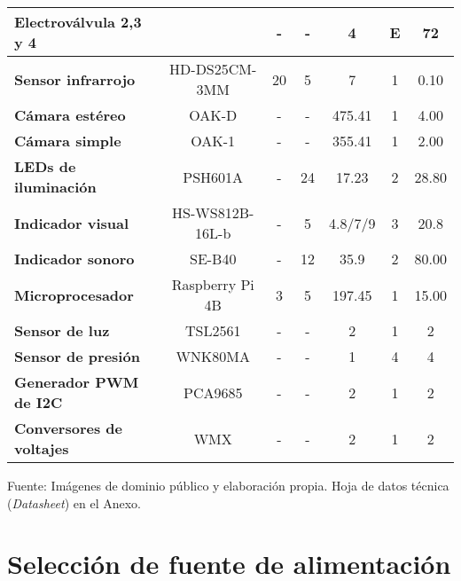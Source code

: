 \begin{mytable}[H]
\begin{tabular}{l|c|c|c|c|c|c|}
		\multicolumn{1}{|l|}{\cellcolor[HTML]{C0C0C0}\textbf{Electroválvula 2,3 y 4}} &  & - & - & 4 & E & 72 \\ \hline
		\multicolumn{1}{|l|}{\cellcolor[HTML]{C0C0C0}\textbf{Sensor infrarrojo}} & HD-DS25CM-3MM & 20 & 5 & 7 & 1 & 0.10 \\ \hline
		\multicolumn{1}{|l|}{\cellcolor[HTML]{C0C0C0}\textbf{Cámara estéreo}} & OAK-D & - & - & 475.41 & 1 & 4.00 \\ \hline
		\multicolumn{1}{|l|}{\cellcolor[HTML]{C0C0C0}\textbf{Cámara simple}} & OAK-1 & - & - & 355.41 & 1 & 2.00 \\ \hline
		\multicolumn{1}{|l|}{\cellcolor[HTML]{C0C0C0}\textbf{LEDs de iluminación}} & PSH601A & - & 24 & 17.23 & 2 & 28.80 \\ \hline
		\multicolumn{1}{|l|}{\cellcolor[HTML]{C0C0C0}\textbf{Indicador visual}} & HS-WS812B-16L-b & - & 5 & 4.8/7/9 & 3 & 20.8 \\ \hline
		\multicolumn{1}{|l|}{\cellcolor[HTML]{C0C0C0}\textbf{Indicador sonoro}} & SE-B40 & - & 12 & 35.9 & 2 & 80.00 \\ \hline
		\multicolumn{1}{|l|}{\cellcolor[HTML]{C0C0C0}\textbf{Microprocesador}} & Raspberry Pi 4B & 3 & 5 & 197.45 & 1 & 15.00 \\ \hline
		\multicolumn{1}{|l|}{\cellcolor[HTML]{C0C0C0}\textbf{Sensor de luz}} & TSL2561 & - & - & 2 & 1 & 2 \\ \hline
		\multicolumn{1}{|l|}{\cellcolor[HTML]{C0C0C0}\textbf{Sensor de presión}} & WNK80MA & - & - & 1 & 4 & 4 \\ \hline
		\multicolumn{1}{|l|}{\cellcolor[HTML]{C0C0C0}\textbf{Generador PWM de I2C}} & PCA9685 & - & - & 2 & 1 & 2 \\ \hline
		\multicolumn{1}{|l|}{\cellcolor[HTML]{C0C0C0}\textbf{Conversores de voltajes}} & WMX & - & - & 2 & 1 & 2 \\ \hline
	\end{tabular}
	\begin{myflushcenteraftertable}	
		Fuente: Imágenes de dominio público y elaboración propia. Hoja de datos técnica (\textit{Datasheet}) en el Anexo.
	\end{myflushcenteraftertable}
\end{mytable}



\section{Selección de fuente de alimentación} 

